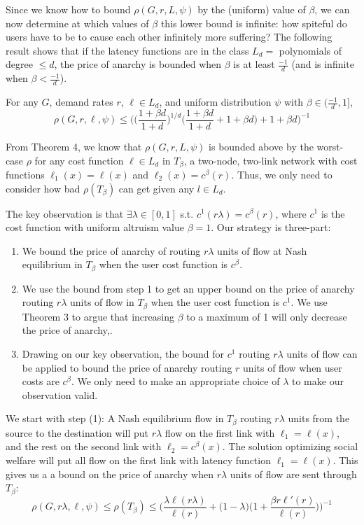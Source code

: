 Since we know how to bound $\rho(G,r,{L},\psi)$ by the (uniform) value of $\beta$, we can now determine at which values of $\beta$ this lower bound is infinite: how spiteful do users have to be to cause each other infinitely more suffering? The following result shows that if the latency functions are in the class $L_d =$ polynomials of degree $\le d$, the price of anarchy is bounded when $\beta$ is at least $\frac{-1}{d}$ (and is infinite when $\beta < \frac{-1}d$).
\begin{theorem}
For any $G$, demand rates $r$, $\ell \in L_d$,
and uniform distribution $\psi$ with $\beta \in (\frac{-1}{d}, 1]$,
    $$\rho(G,r,\ell,\psi) \le \Big(\Big(\frac{1+\beta d}{1+d}\Big)^{1/d}\Big(\frac{1+\beta d}{1+d} + 1 + \beta d\Big)+ 1 + \beta d\Big)^{-1}$$
\end{theorem}
\begin{proof-sketch}
From Theorem 4, we know that 
$\rho(G,r,{L},\psi)$%
 is bounded above by the worst-case $\rho$ for any cost function $\ell \in L_d$ in $T_\beta$, a two-node, two-link network with cost functions $\ell_1(x) = \ell(x)$ and $\ell_2(x) = c^\beta(r)$.
Thus, we only need to consider how bad $\rho(T_\beta)$ can get given any $l\in L_d$.

The key observation is that $\exists\lambda \in [0,1]$ s.t. $c^1(r\lambda) = c^\beta(r)$, where $c^1$ is the cost function with uniform altruism value $\beta=1$. Our strategy is three-part: 
\begin{enumerate}
    \item We bound the price of anarchy of routing $r\lambda$ units of flow at Nash equilibrium in $T_\beta$ when the user cost function is $c^\beta$.
   \item We use the bound from step 1 to get an upper bound on the price of anarchy routing $r\lambda$ units of flow in $T_\beta$ when the user cost function is $c^1$. We use Theorem 3 to argue that increasing $\beta$ to a maximum of 1 will only decrease the price of anarchy,. 
    \item Drawing on our key observation, the bound for $c^1$ routing $r\lambda$ units of flow can be applied to bound the price of anarchy routing $r$ units of flow when user costs are $c^\beta$.
We only need to make an appropriate choice of $\lambda$ to make our observation valid.
\end{enumerate}

We start with step (1): A Nash equilibrium flow in $T_\beta$ routing $r\lambda$ units from the source to the destination will put $r\lambda$ flow on the first link with $\ell_1 = \ell(x)$, and the rest on the second link with $\ell_2 = c^\beta(x)$. The solution optimizing social welfare will put all flow on the first link with latency function $\ell_1 = \ell(x)$.
This gives us a a bound on the price of anarchy when $r\lambda$ units of flow are sent through $T_\beta$:
    $$\rho(G,r\lambda,\ell,\psi) \le \rho(T_\beta) \le \Big(\frac{\lambda \ell(r\lambda)}{\ell(r)} + \Big(1-\lambda\Big)\Big(1+\frac{\beta r\ell'(r)}{\ell(r)}\Big)\Big)^{-1}$$
    

\end{proof-sketch}
